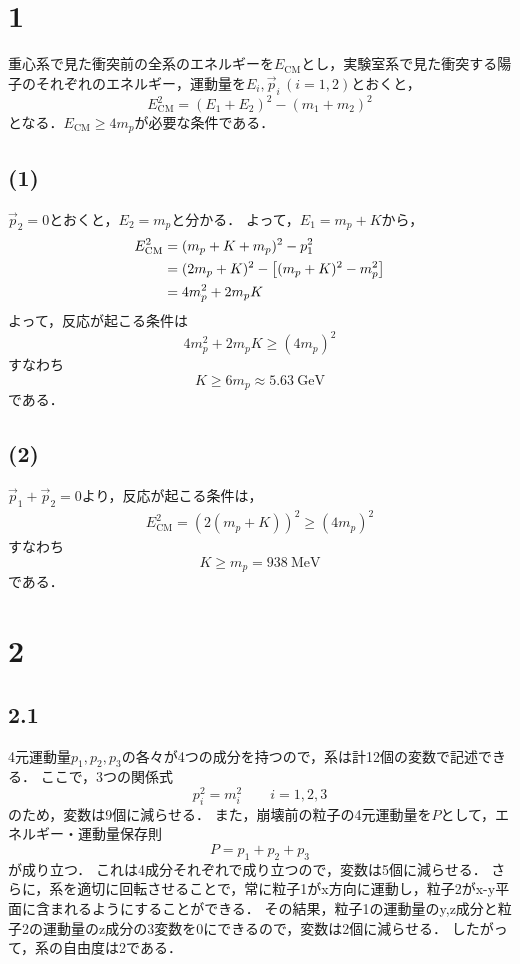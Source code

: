 \section*{1}
重心系で見た衝突前の全系のエネルギーを$E_{\mathrm{CM}}$とし，実験室系で見た衝突する陽子のそれぞれのエネルギー，運動量を$E_i,\vec{p}_i\,(i=1,2)$とおくと，
\begin{equation}
  E_{\mathrm{CM}}^2 = (E_1 + E_2)^2 - (m_1 + m_2)^2
\end{equation}
となる．$E_{\mathrm{CM}} \ge 4m_p$が必要な条件である．

\subsection*{(1)}
$\vec{p}_2 = 0$とおくと，$E_2=m_p$と分かる．
よって，$E_1=m_p+K$から，
\begin{align}
  E_{\mathrm{CM}}^2 &= (m_p+K+m_p)^2 - p_1^2 \notag\\
  &= (2m_p+K)^2 - \left[(m_p+K)^2 - m_p^2\right] \notag\\
  &= 4m_p^2 + 2m_pK
\end{align}
よって，反応が起こる条件は
\begin{equation}
  4m_p^2 + 2m_pK \ge (4m_p)^2
\end{equation}
すなわち
\begin{equation}
  K \ge 6m_p \approx \SI{5.63}{\GeV}
\end{equation}
である．

\subsection*{(2)}
$\vec{p}_1+\vec{p}_2=0$より，反応が起こる条件は，
\begin{align}
  E_{\mathrm{CM}}^2 = \left(2(m_p + K)\right)^2 \ge (4m_p)^2
\end{align}
すなわち
\begin{equation}
  K \ge m_p = \SI{938}{\MeV}
\end{equation}
である．

\section*{2}
\subsection*{2.1}
4元運動量$p_1,p_2,p_3$の各々が4つの成分を持つので，系は計12個の変数で記述できる．
ここで，3つの関係式
\begin{equation}
  p_i^2 = m_i^2\qquad i = 1,2,3
\end{equation}
のため，変数は9個に減らせる．
また，崩壊前の粒子の4元運動量を$P$として，エネルギー・運動量保存則
\begin{equation}
  P = p_1 + p_2 + p_3
\end{equation}
が成り立つ．
これは4成分それぞれで成り立つので，変数は5個に減らせる．
さらに，系を適切に回転させることで，常に粒子1がx方向に運動し，粒子2がx-y平面に含まれるようにすることができる．
その結果，粒子1の運動量のy,z成分と粒子2の運動量のz成分の3変数を0にできるので，変数は2個に減らせる．
したがって，系の自由度は2である．

